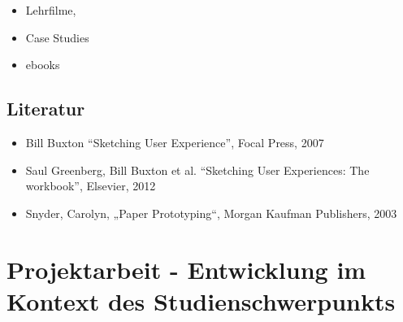 \begin{itemize}
\tightlist
\item
  Lehrfilme,
\item
  Case Studies
\item
  ebooks
\end{itemize}

\section*{Literatur\label{/mi-2017/modulbeschreibungen-master/MA_HCI_Sketching_and_Designing_for_User_Experience}}\label{literaturpathlabelmi-2017modulbeschreibungen-mastermaux5fhciux5fsketchingux5fandux5fdesigningux5fforux5fuserux5fexperience}

\begin{itemize}
\tightlist
\item
  Bill Buxton ``Sketching User Experience'', Focal Press, 2007
\item
  Saul Greenberg, Bill Buxton et al. ``Sketching User Experiences: The
  workbook'', Elsevier, 2012
\item
  Snyder, Carolyn, „Paper Prototyping``, Morgan Kaufman Publishers, 2003
\end{itemize}

\chapter{Projektarbeit - Entwicklung im Kontext des
Studienschwerpunkts\label{/mi-2017/modulbeschreibungen-master/MA_Modul_Projekt_Entwicklung}}\label{projektarbeit---entwicklung-im-kontext-des-studienschwerpunktspathlabelmi-2017modulbeschreibungen-mastermaux5fmodulux5fprojektux5fentwicklung}

